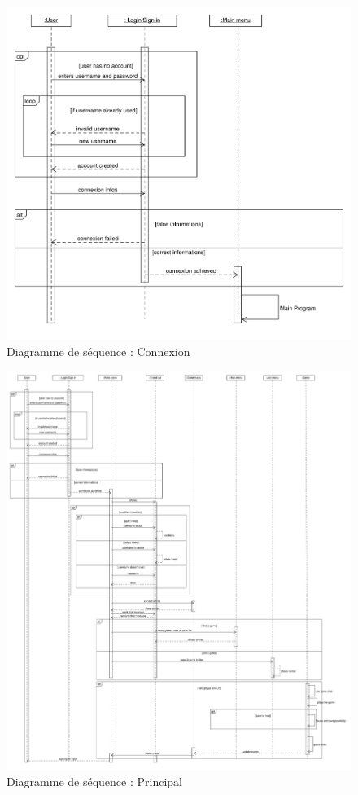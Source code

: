 \documentclass[a4paper,10pt]{article}
\begin{document}
\begin{figure}[H]
	\includegraphics[width=6in]{sequence/connection.pdf}
	\caption{Diagramme de séquence : Connexion}
\end{figure}


\begin{figure}[H]

	\includegraphics[width=6in]{sequence/menu.pdf}
	\caption{Diagramme de séquence : Principal}
\end{figure}
\end{document}
